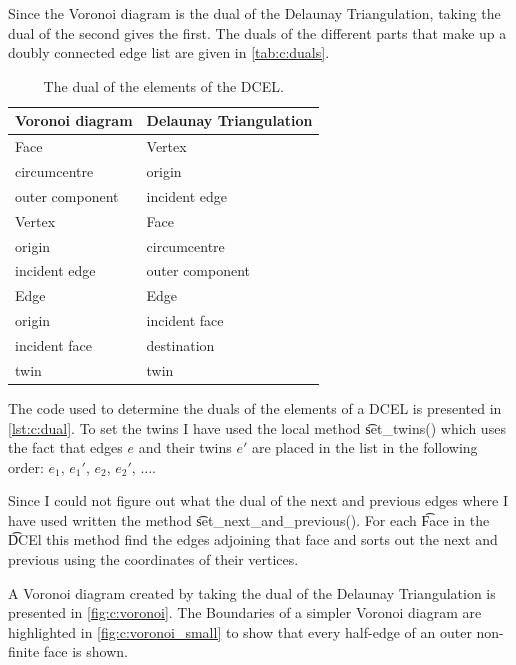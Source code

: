Since the Voronoi diagram is the dual of the Delaunay Triangulation, taking the dual of the second gives the first. The duals of the different parts that make up a doubly connected edge list are given in \autoref{tab:c:duals}.

\begin{table}
	\centering
	\begin{tabular}{ll}
		Voronoi diagram 	& Delaunay Triangulation\\
		\hline
		\hline
		Face 				& Vertex\\
		\hline
		circumcentre 		& origin\\
		outer component 	& incident edge\\
		\hline
		Vertex 				& Face\\
		\hline
		origin 				& circumcentre\\
		incident edge 		& outer component\\
		\hline
		Edge 				& Edge\\
		\hline
		origin 				& incident face\\
		incident face 		& destination\\
		twin 				& twin\\
	\end{tabular}
	\caption{The dual of the elements of the DCEL.}
	\label{tab:c:duals}
\end{table}

The code used to determine the duals of the elements of a DCEL is presented in \autoref{lst:c:dual}. To set the twins I have used the local method \t{set_twins()} which uses the fact that edges $e$ and their twins $e'$ are placed in the list in the following order: $e_1$, $e_1'$, $e_2$, $e_2'$, $\ldots$.



Since I could not figure out what the dual of the next and previous edges where I have used written the method \t{set_next_and_previous()}. For each \t{Face} in the \t{DCEl} this method find the edges adjoining that face and sorts out the next and previous using the coordinates of their vertices. 

A Voronoi diagram created by taking the dual of the Delaunay Triangulation is presented in \autoref{fig:c:voronoi}. The Boundaries of a simpler Voronoi diagram are highlighted in \autoref{fig:c:voronoi_small} to show that every half-edge of an outer non-finite face is shown.

